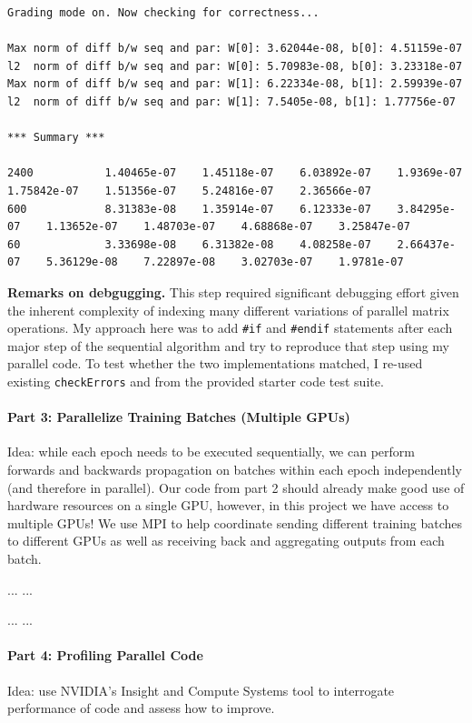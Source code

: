 \documentclass[12pt,letterpaper,twoside]{article}
\begin{document}
\begin{verbatim}
Grading mode on. Now checking for correctness...

Max norm of diff b/w seq and par: W[0]: 3.62044e-08, b[0]: 4.51159e-07
l2  norm of diff b/w seq and par: W[0]: 5.70983e-08, b[0]: 3.23318e-07
Max norm of diff b/w seq and par: W[1]: 6.22334e-08, b[1]: 2.59939e-07
l2  norm of diff b/w seq and par: W[1]: 7.5405e-08, b[1]: 1.77756e-07

*** Summary ***

2400           1.40465e-07    1.45118e-07    6.03892e-07    1.9369e-07     1.75842e-07    1.51356e-07    5.24816e-07    2.36566e-07    
600            8.31383e-08    1.35914e-07    6.12333e-07    3.84295e-07    1.13652e-07    1.48703e-07    4.68868e-07    3.25847e-07    
60             3.33698e-08    6.31382e-08    4.08258e-07    2.66437e-07    5.36129e-08    7.22897e-08    3.02703e-07    1.9781e-07     

\end{verbatim}

\textbf{Remarks on debgugging.} This step required significant debugging effort given 
the inherent complexity of indexing many different variations of parallel matrix 
operations. My approach here was to add \texttt{#if} and \texttt{#endif} statements 
after each major step of the sequential algorithm and try to reproduce that step using 
my parallel code. To test whether the two implementations matched, I re-used existing 
\texttt{checkErrors} and  from the provided starter code test suite.


\paragraph{Part 3: Parallelize Training Batches (Multiple GPUs)} Idea: while each epoch 
needs to be executed sequentially, we can perform forwards and backwards propagation on 
batches within each epoch independently (and therefore in parallel). Our code from part 
2 should already make good use of hardware resources on a single GPU, however, in this 
project we have access to multiple GPUs! We use MPI to help coordinate sending different
training batches to different GPUs as well as receiving back and aggregating outputs from
each batch.

...
...

\begin{cpp}
    ...
    ...
\end{cpp}


\paragraph{Part 4: Profiling Parallel Code} Idea: use NVIDIA's Insight and Compute Systems
tool to interrogate performance of code and assess how to improve.
\end{document}
